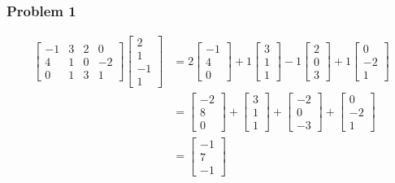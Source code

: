 \documentclass[11pt]{article} %
\begin{document}
\subsubsection*{Problem 1}
\begin{align*}
\begin{bmatrix}
-1 & 3 & 2 & 0\\4 & 1 & 0 & -2\\
0 & 1 & 3 & 1
\end{bmatrix}
\begin{bmatrix}
2\\1\\-1\\1
\end{bmatrix} &= 2
\begin{bmatrix}
-1\\4\\0
\end{bmatrix} + 1
\begin{bmatrix}
3\\1\\1
\end{bmatrix} - 1
\begin{bmatrix}
2\\0\\3
\end{bmatrix} + 1
\begin{bmatrix}
0\\-2\\1
\end{bmatrix}\\
&=
\begin{bmatrix}
-2\\8\\0
\end{bmatrix} +
\begin{bmatrix}
3\\1\\1
\end{bmatrix} +
\begin{bmatrix}
-2\\0\\-3
\end{bmatrix} +
\begin{bmatrix}
0\\-2\\1
\end{bmatrix}\\
&=
\begin{bmatrix}
-1\\7\\-1
\end{bmatrix}
\end{align*}
\end{document}
